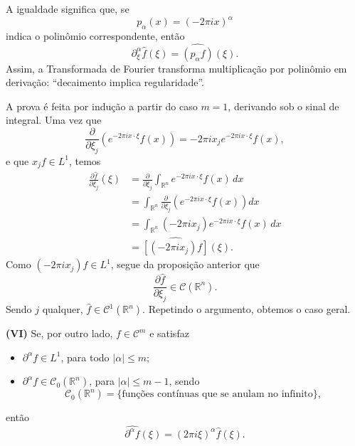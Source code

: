 \documentclass[../distribution_theory_notes.tex]{subfiles}
\begin{document}
\begin{tcolorbox}[
		skin=enhanced,
		title=Observação,
		fonttitle=\bfseries,
		colframe=black,
		colbacktitle=cyan!75!white,
		colback=cyan!15,
		colbacklower=black,
		coltitle=black,
		drop fuzzy shadow,
	]
	A igualdade significa que, se
	\[
		p_{\alpha}(x)=(-2\pi i x)^{\alpha}
	\]
	indica o polinômio correspondente, então
	\[
		\partial_{\xi}^{\alpha}\widehat f(\xi)
		=\widehat{(p_{\alpha}f)}(\xi).
	\]
	Assim, a Transformada de Fourier transforma multiplicação por polinômio em derivação: ``decaimento implica regularidade''.
\end{tcolorbox}

\begin{proof*}
	A prova é feita por indução a partir do caso $m=1$, derivando sob o sinal de integral. Uma vez que
	\[
		\frac{\partial}{\partial \xi_{j}}
		\left(e^{-2\pi i x\cdot\xi}f(x)\right)
		=-2\pi i x_{j}e^{-2\pi i x\cdot\xi}f(x),
	\]
	e que $x_{j}f\in L^{1}$, temos
	\begin{align*}
		\frac{\partial\widehat f}{\partial\xi_{j}}(\xi)
		 & =\frac{\partial}{\partial\xi_{j}}
		\int_{\mathbb{R}^{n}}e^{-2\pi i x\cdot\xi}f(x)\,dx                    \\
		 & =\int_{\mathbb{R}^{n}}
		\frac{\partial}{\partial\xi_{j}}
		\left(e^{-2\pi i x\cdot\xi}f(x)\right)dx                              \\
		 & =\int_{\mathbb{R}^{n}}(-2\pi i x_{j})e^{-2\pi i x\cdot\xi}f(x)\,dx \\
		 & =\widehat{\left[(-2\pi i x_{j})f\right]}(\xi).
	\end{align*}
	Como $(-2\pi i x_{j})f\in L^{1}$, segue da proposição anterior que
	\[
		\frac{\partial\widehat f}{\partial\xi_{j}}\in\mathcal{C}(\mathbb{R}^{n}).
	\]
	Sendo $j$ qualquer, $\widehat f\in\mathcal{C}^{1}(\mathbb{R}^{n})$. Repetindo o argumento, obtemos o caso geral. \qedsymbol
\end{proof*}

\medskip
\noindent\textbf{(VI)} Se, por outro lado, $f\in\mathcal{C}^{m}$ e satisfaz
\begin{itemize}
	\item[(i)] $\partial^{\alpha}f\in L^{1}$, para todo $|\alpha|\leq m$;
	\item[(ii)] $\partial^{\alpha}f\in\mathcal{C}_{0}(\mathbb{R}^{n})$, para $|\alpha|\leq m-1$, sendo
	      \[
		      \mathcal{C}_{0}(\mathbb{R}^{n})
		      =\{\text{funções contínuas que se anulam no infinito}\},
	      \]
\end{itemize}
então
\[
	\widehat{\partial^{\alpha}f}(\xi)
	=(2\pi i\xi)^{\alpha}\widehat f(\xi).
\]
\end{document}
